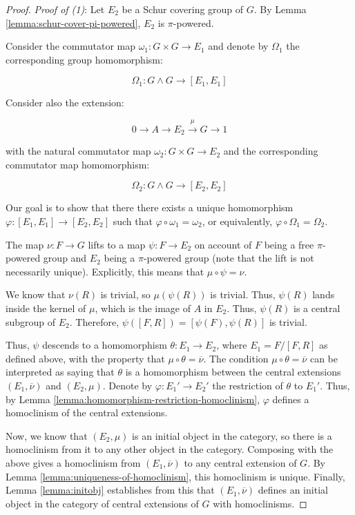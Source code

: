 \documentclass{ucetd}
\begin{document}
\begin{proof}
  {\em Proof of (1)}: Let $E_2$ be a Schur covering group of $G$. By
  Lemma \ref{lemma:schur-cover-pi-powered}, $E_2$ is $\pi$-powered.

  Consider the commutator map $\omega_1:G \times G \to E_1$ and denote
  by $\Omega_1$ the corresponding group homomorphism:

  $$\Omega_1: G \wedge G \to [E_1,E_1]$$

  Consider also the extension:

  $$0 \to A \to E_2 \stackrel{\mu}{\to} G \to 1$$
  
  with the natural commutator map $\omega_2:G \times G \to E_2$ and the
  corresponding commutator map homomorphism:

  $$\Omega_2:G \wedge G \to [E_2,E_2]$$
  
  Our goal is to show that there there exists a unique homomorphism
  $\varphi:[E_1,E_1] \to [E_2,E_2]$ such that $\varphi \circ
  \omega_1 = \omega_2$, or equivalently, $\varphi \circ \Omega_1 =
  \Omega_2$.

  The map $\nu:F \to G$ lifts to a map $\psi:F \to E_2$ on account of
  $F$ being a free $\pi$-powered group and $E_2$ being a $\pi$-powered
  group (note that the lift is not necessarily unique). Explicitly,
  this means that $\mu \circ \psi = \nu$.

  We know that $\nu(R)$ is trivial, so $\mu(\psi(R))$ is trivial. Thus,
  $\psi(R)$ lands inside the kernel of $\mu$, which is the image of $A$
  in $E_2$. Thus, $\psi(R)$ is a central subgroup of $E_2$. Therefore,
  $\psi([F,R]) = [\psi(F),\psi(R)]$ is trivial.
  
  Thus, $\psi$ descends to a homomorphism $\theta:E_1 \to E_2$, where
  $E_1 = F/[F,R]$ as defined above, with the property that $\mu \circ
  \theta = \overline{\nu}$. The condition $\mu \circ \theta =
  \overline{\nu}$ can be interpreted as saying that $\theta$ is a
  homomorphism between the central extensions $(E_1,\overline{\nu})$ and
  $(E_2,\mu)$. Denote by $\varphi:E_1' \to E_2'$ the restriction of
  $\theta$ to $E_1'$. Thus, by Lemma
  \ref{lemma:homomorphism-restriction-homoclinism}, $\varphi$ defines a
  homoclinism of the central extensions. 

  Now, we know that $(E_2,\mu)$ is an initial object in the category,
  so there is a homoclinism from it to any other object in the
  category. Composing with the above gives a homoclinism from
  $(E_1,\overline{\nu})$ to any central extension of $G$. By Lemma
  \ref{lemma:uniqueness-of-homoclinism}, this homoclinism is
  unique. Finally, Lemma \ref{lemma:initobj} establishes from this that
  $(E_1,\overline{\nu})$ defines an initial object in the category of central
  extensions of $G$ with homoclinisms.


\end{proof}
\end{document}
